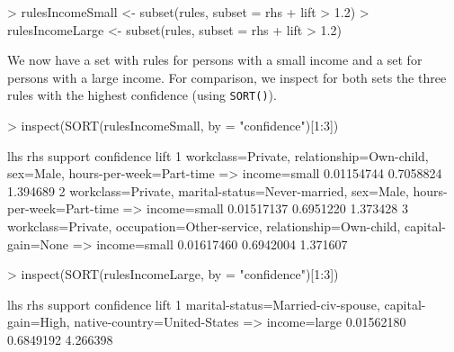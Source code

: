 \documentclass[10pt,a4paper]{article}
\newcommand{\func}[1]{\mbox{\texttt{#1()}}}
\begin{document}
\begin{Schunk}
\begin{Sinput}
> rulesIncomeSmall <- subset(rules, subset = rhs %
+     lift > 1.2)
> rulesIncomeLarge <- subset(rules, subset = rhs %
+     lift > 1.2)
\end{Sinput}
\end{Schunk}

We now have a set with rules for persons with a small income and a set
for persons with a large income.  For comparison, we inspect for both
sets the three rules with the highest confidence (using \func{SORT}).

{\samepage\small
\begin{Schunk}
\begin{Sinput}
> inspect(SORT(rulesIncomeSmall, by = "confidence")[1:3])
\end{Sinput}
\begin{Soutput}
  lhs                                rhs               support confidence     lift
1 {workclass=Private,                                                             
    relationship=Own-child,                                                       
    sex=Male,                                                                     
    hours-per-week=Part-time}     => {income=small} 0.01154744  0.7058824 1.394689
2 {workclass=Private,                                                             
    marital-status=Never-married,                                                 
    sex=Male,                                                                     
    hours-per-week=Part-time}     => {income=small} 0.01517137  0.6951220 1.373428
3 {workclass=Private,                                                             
    occupation=Other-service,                                                     
    relationship=Own-child,                                                       
    capital-gain=None}            => {income=small} 0.01617460  0.6942004 1.371607
\end{Soutput}
\begin{Sinput}
> inspect(SORT(rulesIncomeLarge, by = "confidence")[1:3])
\end{Sinput}
\begin{Soutput}
  lhs                                    rhs               support confidence     lift
1 {marital-status=Married-civ-spouse,                                                 
    capital-gain=High,                                                                
    native-country=United-States}     => {income=large} 0.01562180  0.6849192 4.266398

\end{Soutput}
\end{Schunk}}
\end{document}
